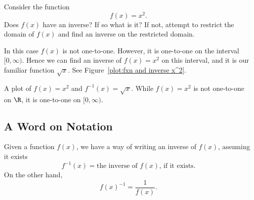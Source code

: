 \documentclass{ximera}
\begin{document}
\begin{example}
Consider the function
\[
f(x) = x^2.
\]
Does $f(x)$ have an inverse? If so what is it? If not, attempt to
restrict the domain of $f(x)$ and find an inverse on the restricted
domain.
\end{example}


\begin{solution}
In this case $f(x)$ is not one-to-one. However, it is one-to-one on
the interval $[0,\infty)$. Hence we can find an inverse of $f(x)=x^2$
  on this interval, and it is our familiar function $\sqrt{x}$.  See
  Figure~\ref{plot:fxn and inverse x^2}.
\end{solution}

\begin{marginfigure}[0in]
\caption{A plot of $f(x)=x^2$ and $f^{-1}(x) = \sqrt{x}$. While
  $f(x)=x^2$ is not one-to-one on $\R$, it is one-to-one on
  $[0,\infty)$.}
\label{plot:fxn and inverse x^2}
\end{marginfigure}


\subsection{A Word on Notation}

Given a function $f(x)$, we have a way of writing an inverse of $f(x)$, assuming it exists
\[
f^{-1}(x) = \text{the inverse of $f(x)$, if it exists.}
\]
On the other hand,
\[
f(x)^{-1} = \frac{1}{f(x)}.
\]
\end{document}
